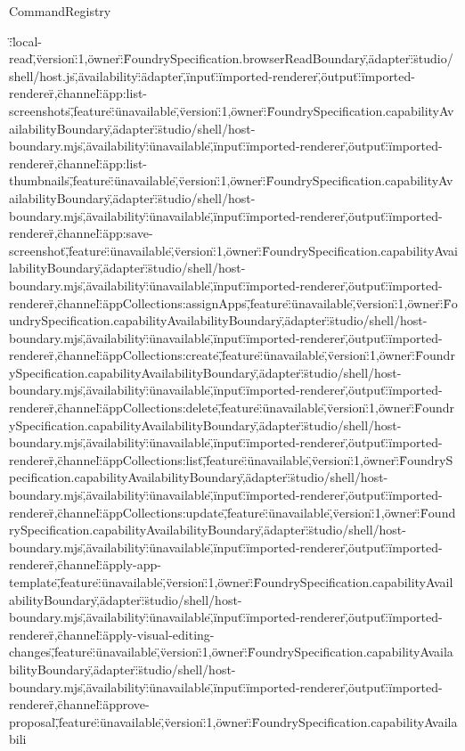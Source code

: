 \begin{lexlean}{CommandRegistry}
\begin{semanticmodule}
{\":\"local-read\",\"version\":1,\"owner\":\"FoundrySpecification.browserReadBoundary\",\"adapter\":\"studio/shell/host.js\",\"availability\":\"adapter\",\"input\":\"imported-renderer\",\"output\":\"imported-renderer\"},{\"channel\":\"app:list-screenshots\",\"feature\":\"unavailable\",\"version\":1,\"owner\":\"FoundrySpecification.capabilityAvailabilityBoundary\",\"adapter\":\"studio/shell/host-boundary.mjs\",\"availability\":\"unavailable\",\"input\":\"imported-renderer\",\"output\":\"imported-renderer\"},{\"channel\":\"app:list-thumbnails\",\"feature\":\"unavailable\",\"version\":1,\"owner\":\"FoundrySpecification.capabilityAvailabilityBoundary\",\"adapter\":\"studio/shell/host-boundary.mjs\",\"availability\":\"unavailable\",\"input\":\"imported-renderer\",\"output\":\"imported-renderer\"},{\"channel\":\"app:save-screenshot\",\"feature\":\"unavailable\",\"version\":1,\"owner\":\"FoundrySpecification.capabilityAvailabilityBoundary\",\"adapter\":\"studio/shell/host-boundary.mjs\",\"availability\":\"unavailable\",\"input\":\"imported-renderer\",\"output\":\"imported-renderer\"},{\"channel\":\"appCollections:assignApps\",\"feature\":\"unavailable\",\"version\":1,\"owner\":\"FoundrySpecification.capabilityAvailabilityBoundary\",\"adapter\":\"studio/shell/host-boundary.mjs\",\"availability\":\"unavailable\",\"input\":\"imported-renderer\",\"output\":\"imported-renderer\"},{\"channel\":\"appCollections:create\",\"feature\":\"unavailable\",\"version\":1,\"owner\":\"FoundrySpecification.capabilityAvailabilityBoundary\",\"adapter\":\"studio/shell/host-boundary.mjs\",\"availability\":\"unavailable\",\"input\":\"imported-renderer\",\"output\":\"imported-renderer\"},{\"channel\":\"appCollections:delete\",\"feature\":\"unavailable\",\"version\":1,\"owner\":\"FoundrySpecification.capabilityAvailabilityBoundary\",\"adapter\":\"studio/shell/host-boundary.mjs\",\"availability\":\"unavailable\",\"input\":\"imported-renderer\",\"output\":\"imported-renderer\"},{\"channel\":\"appCollections:list\",\"feature\":\"unavailable\",\"version\":1,\"owner\":\"FoundrySpecification.capabilityAvailabilityBoundary\",\"adapter\":\"studio/shell/host-boundary.mjs\",\"availability\":\"unavailable\",\"input\":\"imported-renderer\",\"output\":\"imported-renderer\"},{\"channel\":\"appCollections:update\",\"feature\":\"unavailable\",\"version\":1,\"owner\":\"FoundrySpecification.capabilityAvailabilityBoundary\",\"adapter\":\"studio/shell/host-boundary.mjs\",\"availability\":\"unavailable\",\"input\":\"imported-renderer\",\"output\":\"imported-renderer\"},{\"channel\":\"apply-app-template\",\"feature\":\"unavailable\",\"version\":1,\"owner\":\"FoundrySpecification.capabilityAvailabilityBoundary\",\"adapter\":\"studio/shell/host-boundary.mjs\",\"availability\":\"unavailable\",\"input\":\"imported-renderer\",\"output\":\"imported-renderer\"},{\"channel\":\"apply-visual-editing-changes\",\"feature\":\"unavailable\",\"version\":1,\"owner\":\"FoundrySpecification.capabilityAvailabilityBoundary\",\"adapter\":\"studio/shell/host-boundary.mjs\",\"availability\":\"unavailable\",\"input\":\"imported-renderer\",\"output\":\"imported-renderer\"},{\"channel\":\"approve-proposal\",\"feature\":\"unavailable\",\"version\":1,\"owner\":\"FoundrySpecification.capabilityAvailabili}
\end{semanticmodule}
\end{lexlean}
